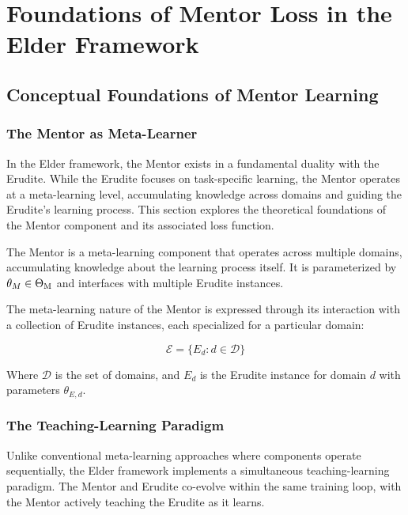 \chapter{Foundations of Mentor Loss in the Elder Framework}

\section{Conceptual Foundations of Mentor Learning}

\subsection{The Mentor as Meta-Learner}

In the Elder framework, the Mentor exists in a fundamental duality with the Erudite. While the Erudite focuses on task-specific learning, the Mentor operates at a meta-learning level, accumulating knowledge across domains and guiding the Erudite's learning process. This section explores the theoretical foundations of the Mentor component and its associated loss function.

\begin{definition}[Mentor]
The Mentor is a meta-learning component that operates across multiple domains, accumulating knowledge about the learning process itself. It is parameterized by $\theta_M \in \Theta_{\text{M}}$ and interfaces with multiple Erudite instances.
\end{definition}

The meta-learning nature of the Mentor is expressed through its interaction with a collection of Erudite instances, each specialized for a particular domain:

\begin{equation}
\mathcal{E} = \{E_d : d \in \mathcal{D}\}
\end{equation}

Where $\mathcal{D}$ is the set of domains, and $E_d$ is the Erudite instance for domain $d$ with parameters $\theta_{E,d}$.

\subsection{The Teaching-Learning Paradigm}

Unlike conventional meta-learning approaches where components operate sequentially, the Elder framework implements a simultaneous teaching-learning paradigm. The Mentor and Erudite co-evolve within the same training loop, with the Mentor actively teaching the Erudite as it learns.

